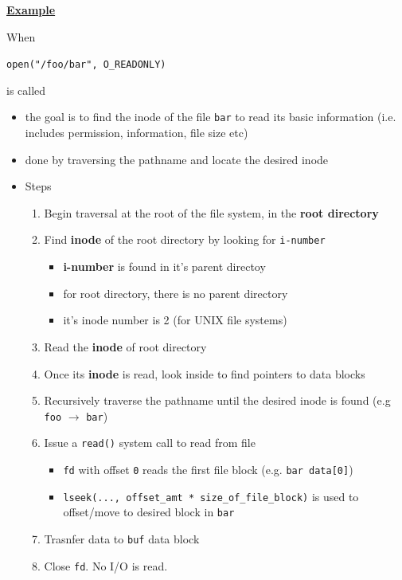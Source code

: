 \documentclass[12pt]{article}
\begin{document}
\bigskip

\underline{\textbf{Example}}

\bigskip

When

\bigskip

\texttt{open("/foo/bar", O\_READONLY)}

\bigskip

is called

\bigskip

\begin{itemize}
    \item the goal is to find the inode of the file \texttt{bar} to read its basic information
    (i.e. includes permission, information, file size etc)
    \item done by traversing the pathname and locate the desired inode
    \item Steps

    \begin{enumerate}[1.]
        \item Begin traversal at the root of the file system, in the \textbf{root directory}

        \item Find \textbf{inode} of the root directory by looking for \texttt{i-number}

        \begin{itemize}
            \item \textbf{i-number} is found in it's parent directoy
            \item for root directory, there is no parent directory
            \item it's inode number is 2 (for UNIX file systems)
        \end{itemize}

        \item Read the \textbf{inode} of root directory
        \item Once its \textbf{inode} is read, look inside to find pointers
        to data blocks
        \item Recursively traverse the pathname until the desired inode is found (e.g \texttt{foo} $\to$ \texttt{bar})
        \item Issue a \texttt{read()} system call to read from file

        \begin{itemize}
            \item \texttt{fd} with offset \texttt{0} reads the first file block (e.g. \texttt{bar data[0]})
            \item \texttt{lseek(..., offset\_amt * size\_of\_file\_block)} is used to offset/move to desired block in \texttt{bar}
        \end{itemize}

        \item Trasnfer data to \texttt{buf} data block

        \item Close \texttt{fd}. No I/O is read.
    \end{enumerate}
\end{itemize}
\end{document}
